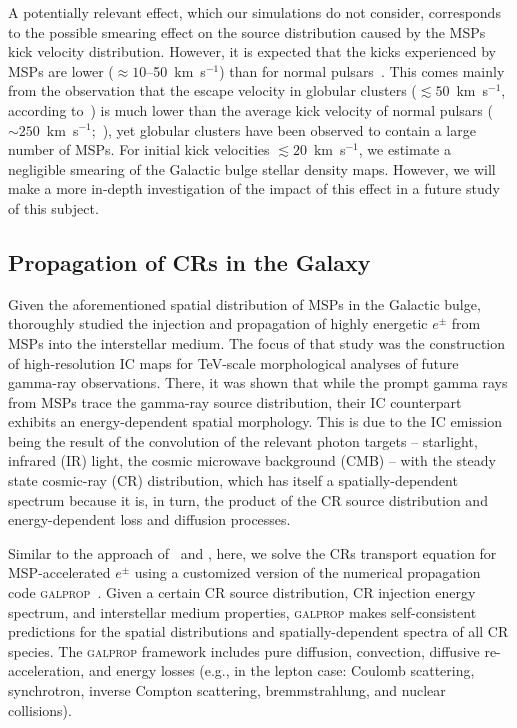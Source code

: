 \documentclass[doublespace,nopageskip]{VTthesis} %
\begin{document}
A potentially relevant effect, which our simulations do not consider, corresponds to the possible smearing effect on the source distribution caused by the MSPs kick velocity distribution. However, it is expected that the kicks experienced by MSPs are lower ($\approx 10$--50~km~s$^{-1}$) than for normal pulsars~\citep{Podsiadlowski:2005}. This comes mainly from the observation that the escape velocity in globular clusters ($\lesssim 50$~km~s$^{-1}$, according to~\citealt{Pfahl:2001df}) is much lower than the average kick velocity of normal pulsars ($\sim 250$~km~s$^{-1}$;~\citealt{Hobbs:2005yx,Atri:2019fbx}), yet globular clusters have been observed to contain a large number of MSPs. For initial kick velocities $\lesssim 20$~km~s$^{-1}$, we estimate a negligible smearing of the Galactic bulge stellar density maps. However, we will make a more in-depth investigation of the impact of this effect in a future study of this subject. 

\subsection{Propagation of CRs in the Galaxy}
\label{subsec:propagation}

Given the aforementioned spatial distribution of MSPs in the Galactic bulge, \cite{Song:2019nrx} thoroughly studied the injection and propagation of highly energetic $e^{\pm}$ from MSPs into the interstellar medium. The focus of that study was the construction of high-resolution IC maps for TeV-scale morphological analyses of future gamma-ray observations. There, it was shown that while the prompt gamma rays from MSPs trace the gamma-ray source distribution, their IC counterpart exhibits an energy-dependent spatial morphology. This is due to the IC emission being the result of 
the convolution of the relevant photon targets -- starlight, infrared (IR) light, the cosmic microwave background (CMB) -- with the
steady state cosmic-ray (CR) distribution, which has itself 
a spatially-dependent spectrum because it is, in turn, the product of the CR source distribution and energy-dependent loss and diffusion processes.


Similar to the approach of~\citet{Song:2019nrx} and \citet{Ishiwata:2019aet}, here, we solve the CRs transport equation for MSP-accelerated $e^{\pm}$ using a customized version of the numerical propagation code \textsc{galprop}~\citep{Porter:2006tb,Strong:2007nh}. Given a certain CR source distribution, CR injection energy spectrum, and interstellar medium properties, \textsc{galprop} makes self-consistent predictions  
for the spatial distributions and spatially-dependent spectra of
 all CR species. The \textsc{galprop} framework includes pure diffusion, convection, diffusive re-acceleration, and energy losses (e.g., in the lepton case: Coulomb scattering, synchrotron, inverse Compton scattering, bremmstrahlung,  and nuclear collisions). 
\end{document}
